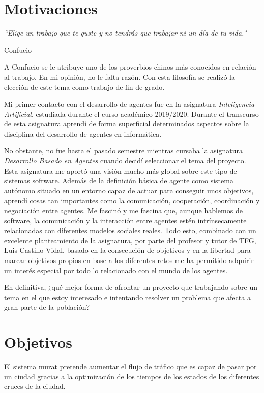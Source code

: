 \section{Motivaciones}
\epigraph{\textit{``Elige un trabajo que te guste y no tendrás que trabajar ni un día de tu vida."}}{Confucio}

A Confucio se le atribuye uno de los proverbios chinos más conocidos en relación al trabajo. En mi opinión, no le falta razón. Con esta filosofía se realizó la elección de este tema como trabajo de fin de grado.

Mi primer contacto con el desarrollo de agentes fue en la asignatura \textit{Inteligencia Artificial}, estudiada durante el curso académico 2019/2020. Durante el transcurso de esta asignatura aprendí de forma superficial determinados aspectos sobre la disciplina del desarrollo de agentes en informática.

No obstante, no fue hasta el pasado semestre mientras cursaba la asignatura \textit{Desarrollo Basado en Agentes} cuando decidí seleccionar el tema del proyecto. Esta asignatura me aportó una visión mucho más global sobre este tipo de sistemas software. Además de la definición básica de agente como sistema autónomo situado en un entorno capaz de actuar para conseguir unos objetivos, aprendí cosas tan importantes como la comunicación, cooperación, coordinación y negociación entre agentes. Me fascinó y me fascina que, aunque hablemos de software, la comunicación y la interacción entre agentes estén intrínsecamente relacionadas con diferentes modelos sociales reales. Todo esto, combinado con un excelente planteamiento de la asignatura, por parte del profesor y tutor de TFG, Luis Castillo Vidal, basado en la consecución de objetivos y en la libertad para marcar objetivos propios en base a los diferentes retos me ha permitido adquirir un interés especial por todo lo relacionado con el mundo de los agentes.
    
En definitiva, ¿qué mejor forma de afrontar un proyecto que trabajando sobre un tema en el que estoy interesado e intentando resolver un problema que afecta a gran parte de la población?

\section{Objetivos}
    \label{section:objetivos}
El sistema \acrshort{murat} pretende aumentar el flujo de tráfico que es capaz de pasar por un ciudad gracias a la optimización de los tiempos de los estados de los diferentes cruces de la ciudad.

